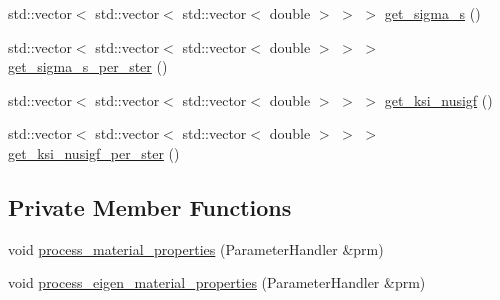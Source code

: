 \begin{DoxyCompactItemize}
\item 
std\+::vector$<$ std\+::vector$<$ std\+::vector$<$ double $>$ $>$ $>$ \hyperlink{class_material_properties_a25c7a9ed0b651758dab132bf627c6269}{get\+\_\+sigma\+\_\+s} ()
\item 
std\+::vector$<$ std\+::vector$<$ std\+::vector$<$ double $>$ $>$ $>$ \hyperlink{class_material_properties_a9dbfb1ca140d3b5de3dff2994899182f}{get\+\_\+sigma\+\_\+s\+\_\+per\+\_\+ster} ()
\item 
std\+::vector$<$ std\+::vector$<$ std\+::vector$<$ double $>$ $>$ $>$ \hyperlink{class_material_properties_af0b54d368b5e4dbe43f71a51f58f1192}{get\+\_\+ksi\+\_\+nusigf} ()
\item 
std\+::vector$<$ std\+::vector$<$ std\+::vector$<$ double $>$ $>$ $>$ \hyperlink{class_material_properties_a3cc177eb673386b4019133ecadfea6e4}{get\+\_\+ksi\+\_\+nusigf\+\_\+per\+\_\+ster} ()
\end{DoxyCompactItemize}
\subsection*{Private Member Functions}
\begin{DoxyCompactItemize}
\item 
void \hyperlink{class_material_properties_a83121d60325c02dbce98968b45134993}{process\+\_\+material\+\_\+properties} (Parameter\+Handler \&prm)
\item 
void \hyperlink{class_material_properties_a2a25d8392fb1002f27e048d40f37d627}{process\+\_\+eigen\+\_\+material\+\_\+properties} (Parameter\+Handler \&prm)
\end{DoxyCompactItemize}
